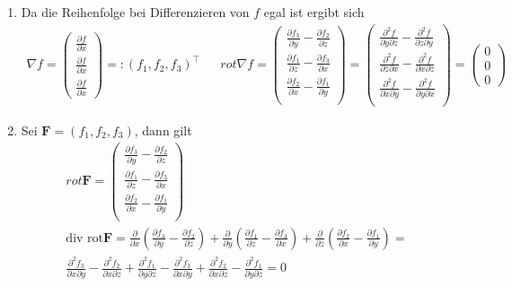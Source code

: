\documentclass[]{article}
\begin{document}
\begin{enumerate}[label=(\roman*)]
	\item Da die Reihenfolge bei Differenzieren von $f$ egal ist ergibt sich
	\begin{align*}
		\nabla f = \begin{pmatrix}
			\frac{\partial f}{\partial x} \\ \frac{\partial f}{\partial x} \\ \frac{\partial f}{\partial x}
		\end{pmatrix} =: (f_1, f_2, f_3)^\top &&
		rot \nabla f = \begin{pmatrix}
			\frac{\partial f_3}{\partial y} - \frac{\partial f_2}{\partial z}\\
			\frac{\partial f_1}{\partial z} - \frac{\partial f_3}{\partial x}\\
			\frac{\partial f_2}{\partial x} - \frac{\partial f_1}{\partial y}\\
		\end{pmatrix} = \begin{pmatrix} 
		\frac{\partial^2 f}{\partial y \partial z} - \frac{\partial^2 f}{\partial z \partial y}\\
		\frac{\partial^2 f}{\partial z \partial x} - \frac{\partial^2 f}{\partial x \partial z}\\
		\frac{\partial^2 f}{\partial x \partial y} - \frac{\partial^2 f}{\partial y \partial x}\\
		\end{pmatrix} = \begin{pmatrix}
			0 \\ 0 \\ 0
		\end{pmatrix}
	\end{align*}

	\item Sei $\bm{F} = (f_1, f_2, f_3)$, dann gilt
	\begin{align*}
		rot \bm{F} = \begin{pmatrix}
			\frac{\partial f_3}{\partial y} - \frac{\partial f_2}{\partial z}\\
			\frac{\partial f_1}{\partial z} - \frac{\partial f_3}{\partial x}\\
			\frac{\partial f_2}{\partial x} - \frac{\partial f_1}{\partial y}\\
		\end{pmatrix}\\
		\text{div rot} \bm{F} = \frac{\partial}{\partial x} \left(\frac{\partial f_3}{\partial y} - \frac{\partial f_2}{\partial z}\right) + \frac{\partial}{\partial y} \left(\frac{\partial f_1}{\partial z} - \frac{\partial f_3}{\partial x}\right) + \frac{\partial}{\partial z} \left(\frac{\partial f_2}{\partial x} - \frac{\partial f_1}{\partial y}\right) = \\
		\frac{\partial^2 f_3}{\partial x \partial y} - \frac{\partial^2 f_2}{\partial x \partial z} + \frac{\partial^2 f_1}{\partial y \partial z} - \frac{\partial^2 f_3}{\partial x \partial y} + \frac{\partial^2 f_2}{\partial x \partial z} - \frac{\partial^2 f_1}{\partial y \partial z} = 0
	\end{align*}
\end{enumerate}
\end{document}
